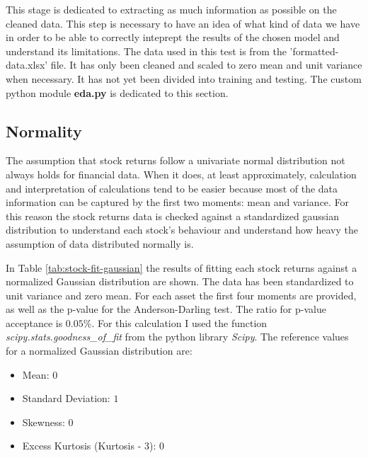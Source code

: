This stage is dedicated to extracting as much information as possible on the cleaned data. This step is necessary to have an idea of what kind of data we have in order to be able to correctly inteprept the results of the chosen model and understand its limitations.
The data used in this test is from the 'formatted-data.xlsx' file. It has only been cleaned and scaled to zero mean and unit variance when necessary. It has not yet been divided into training and testing.
The custom python module \textbf{eda.py} is dedicated to this section.

\subsection{Normality}
The assumption that stock returns follow a univariate normal distribution not always holds for financial data. When it does, at least approximately, calculation and interpretation of calculations tend to be easier because most of the data information can be captured by the first two moments: mean and variance. For this reason the stock returns data is checked against a standardized gaussian distribution to understand each stock's behaviour and understand how heavy the assumption of data distributed normally is.

In Table \ref{tab:stock-fit-gaussian} the results of fitting each stock returns against a normalized Gaussian distribution are shown. The data has been standardized to unit variance and zero mean. For each asset the first four moments are provided, as well as  the p-value for the Anderson-Darling test. The ratio for p-value acceptance is $0.05\%$. For this calculation I used the function \textit{scipy.stats.goodness\_of\_fit} from the python library \textit{Scipy}.
The reference values for a normalized Gaussian distribution are:
\begin{itemize}
    \item Mean: $0$
    \item Standard Deviation: $1$
    \item Skewness: $0$
    \item Excess Kurtosis (Kurtosis - $3$): $0$
\end{itemize}

